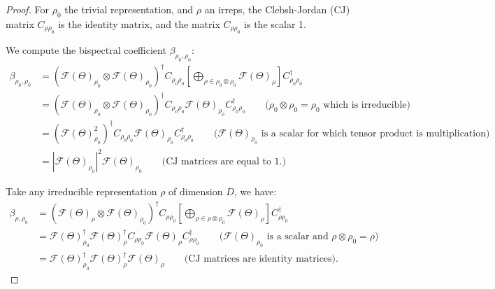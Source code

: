 \begin{proof}
    For $\rho_0$ the trivial representation, and $\rho$ an irreps, the Clebsh-Jordan (CJ) matrix $C_{{\rho} {\rho_0}}$ is the identity matrix, and the matrix $C_{{\rho} {\rho_0}}$ is the scalar 1.


    We compute the bispectral coefficient $\beta_{\rho_0, \rho_0}$:
    \begin{align*}
    \beta_{\rho_0, \rho_0}
    &=
    (\mathcal{F}(\Theta)_{\rho_0} \otimes \mathcal{F}(\Theta)_{\rho_0})^\dagger C_{{\rho_0} {\rho_0}}
    \left[
    \bigoplus_{\rho \in \rho_0 \otimes \rho_0}
        \mathcal{F}(\Theta)_\rho
    \right] C_{{\rho_0} {\rho_0}}^{\dagger} \\
    &=
    (\mathcal{F}(\Theta)_{\rho_0} \otimes \mathcal{F}(\Theta)_{\rho_0})^\dagger C_{{\rho_0} {\rho_0}}
        \mathcal{F}(\Theta)_{\rho_0}
     C_{{\rho_0} {\rho_0}}^{\dagger}
    \qquad \text{($\rho_0 \otimes \rho_0 = \rho_0$ which is irreducible)}
    \\
    &=
    (\mathcal{F}(\Theta)_{\rho_0}^2)^\dagger C_{{\rho_0} {\rho_0}}
        \mathcal{F}(\Theta)_{\rho_0}
     C_{{\rho_0} {\rho_0}}^{\dagger}
    \qquad \text{($\mathcal{F}(\Theta)_{\rho_0}$ is a scalar for which tensor product is multiplication)}
    \\
    &=|\mathcal{F}(\Theta)_{\rho_0}|^2 \mathcal{F}(\Theta)_{\rho_0}
    \qquad\text{(CJ matrices are equal to 1.)}
    \end{align*}

    Take any irreducible representation $\rho$ of dimension $D$, we have:
    \begin{align*}
        \beta_{\rho, \rho_0}
        &= (\mathcal{F}(\Theta)_{\rho} \otimes \mathcal{F}(\Theta)_{\rho_0})^\dagger C_{{\rho} {\rho_0}}
    \left[
    \bigoplus_{\rho \in \rho \otimes \rho_0}
        \mathcal{F}(\Theta)_\rho
    \right] C_{{\rho} {\rho_0}}^{\dagger} \\
        &= \mathcal{F}(\Theta)_{\rho_0}^\dagger \mathcal{F}(\Theta)_{\rho}^\dagger C_{{\rho} {\rho_0}}
        \mathcal{F}(\Theta)_{\rho} C_{{\rho} {\rho_0}}^{\dagger} \qquad\text{($\mathcal{F}(\Theta)_{\rho_0}$ is a scalar and $\rho \otimes \rho_0 = \rho$)}\\
        &=\mathcal{F}(\Theta)_{\rho_0}^\dagger \mathcal{F}(\Theta)_{\rho}^\dagger\mathcal{F}(\Theta)_{\rho} \qquad\text{(CJ matrices are identity matrices)}.
    \end{align*}
    \end{proof}

